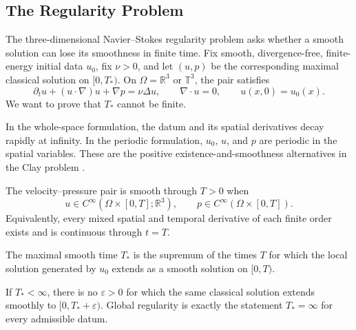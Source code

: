 \subsection{The Regularity Problem}\label{sub:TheRegularityProblem}

The three-dimensional Navier--Stokes regularity problem asks whether a smooth solution can lose its smoothness in finite time.
Fix smooth, divergence-free, finite-energy initial data \(u_0\), fix \(\nu>0\), and let \((u,p)\) be the corresponding maximal classical solution on \([0,T_*)\).
On \(\Omega=\mathbb R^3\) or \(\mathbb T^3\), the pair satisfies
\[
  \partial_tu+(u\cdot\nabla)u+\nabla p
  =
  \nu\Delta u,
  \qquad
  \nabla\cdot u=0,
  \qquad
  u(x,0)=u_0(x).
\]
We want to prove that \(T_*\) cannot be finite.

In the whole-space formulation, the datum and its spatial derivatives decay rapidly at infinity.
In the periodic formulation, \(u_0\), \(u\), and \(p\) are periodic in the spatial variables.
These are the positive existence-and-smoothness alternatives in the Clay problem \parencite{Fefferman2000}.


\begin{definition}\label{def:Smoothness}
The velocity--pressure pair is smooth through \(T>0\) when
\[
  u\in C^\infty\!\left(\Omega\times[0,T];\mathbb R^3\right),
  \qquad
  p\in C^\infty\!\left(\Omega\times[0,T]\right).
\]
Equivalently, every mixed spatial and temporal derivative of each finite order exists and is continuous through \(t=T\).
\end{definition}

\begin{definition}\label{def:Continuation}
The maximal smooth time \(T_*\) is the supremum of the times \(T\) for which the local solution generated by \(u_0\) extends as a smooth solution on \([0,T)\).
\end{definition}

If \(T_*<\infty\), there is no \(\varepsilon>0\) for which the same classical solution extends smoothly to \([0,T_*+\varepsilon)\).
Global regularity is exactly the statement \(T_*=\infty\) for every admissible datum.
